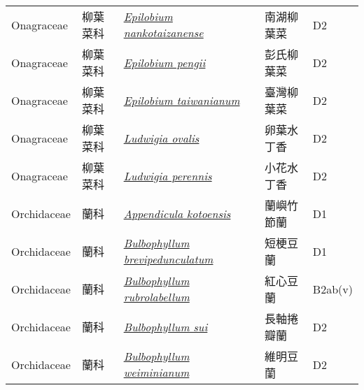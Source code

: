 {\begin{longtable}{p{2.5cm}p{2cm}p{5cm}p{2.5cm}p{3cm}}
    Onagraceae & 柳葉菜科 & \href{http://www.theplantlist.org/tpl1.1/search?q=Epilobium+nankotaizanense}{\textit{Epilobium nankotaizanense} } & 南湖柳葉菜 & D2 \index{Epilobium@\textit{Epilobium}!nankotaizanense@\textit{nankotaizanense}}  \index{南湖柳葉菜} \\
    Onagraceae & 柳葉菜科 & \href{http://www.theplantlist.org/tpl1.1/search?q=Epilobium+pengii}{\textit{Epilobium pengii} } & 彭氏柳葉菜 & D2 \index{Epilobium@\textit{Epilobium}!pengii@\textit{pengii}}  \index{彭氏柳葉菜} \\
    Onagraceae & 柳葉菜科 & \href{http://www.theplantlist.org/tpl1.1/search?q=Epilobium+taiwanianum}{\textit{Epilobium taiwanianum} } & 臺灣柳葉菜 & D2 \index{Epilobium@\textit{Epilobium}!taiwanianum@\textit{taiwanianum}}  \index{臺灣柳葉菜} \\
    Onagraceae & 柳葉菜科 & \href{http://www.theplantlist.org/tpl1.1/search?q=Ludwigia+ovalis}{\textit{Ludwigia ovalis} } & 卵葉水丁香 & D2 \index{Ludwigia@\textit{Ludwigia}!ovalis@\textit{ovalis}}  \index{卵葉水丁香} \\
    Onagraceae & 柳葉菜科 & \href{http://www.theplantlist.org/tpl1.1/search?q=Ludwigia+perennis}{\textit{Ludwigia perennis} } & 小花水丁香 & D2 \index{Ludwigia@\textit{Ludwigia}!perennis@\textit{perennis}}  \index{小花水丁香} \\
    Orchidaceae & 蘭科 & \href{http://www.theplantlist.org/tpl1.1/search?q=Appendicula+kotoensis}{\textit{Appendicula kotoensis} } & 蘭嶼竹節蘭 & D1 \index{Appendicula@\textit{Appendicula}!kotoensis@\textit{kotoensis}}  \index{蘭嶼竹節蘭} \\
    Orchidaceae & 蘭科 & \href{http://www.theplantlist.org/tpl1.1/search?q=Bulbophyllum+brevipedunculatum}{\textit{Bulbophyllum brevipedunculatum} } & 短梗豆蘭 & D1 \index{Bulbophyllum@\textit{Bulbophyllum}!brevipedunculatum@\textit{brevipedunculatum}}  \index{短梗豆蘭} \\
    Orchidaceae & 蘭科 & \href{http://www.theplantlist.org/tpl1.1/search?q=Bulbophyllum+rubrolabellum}{\textit{Bulbophyllum rubrolabellum} } & 紅心豆蘭 & B2ab(v) \index{Bulbophyllum@\textit{Bulbophyllum}!rubrolabellum@\textit{rubrolabellum}}  \index{紅心豆蘭} \\
    Orchidaceae & 蘭科 & \href{http://www.theplantlist.org/tpl1.1/search?q=Bulbophyllum+sui}{\textit{Bulbophyllum sui} } & 長軸捲瓣蘭 & D2 \index{Bulbophyllum@\textit{Bulbophyllum}!sui@\textit{sui}}  \index{長軸捲瓣蘭} \\
    Orchidaceae & 蘭科 & \href{http://www.theplantlist.org/tpl1.1/search?q=Bulbophyllum+weiminianum}{\textit{Bulbophyllum weiminianum} } & 維明豆蘭 & D2 \index{Bulbophyllum@\textit{Bulbophyllum}!weiminianum@\textit{weiminianum}}  \index{維明豆蘭} \\

\end{longtable}}
